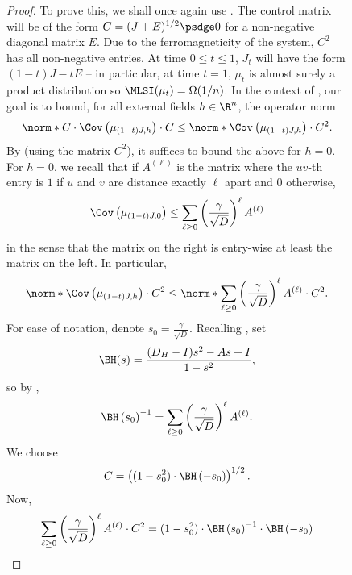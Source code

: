 \documentclass[11pt,letterpaper]{article}
\begin{document}
\begin{figure}
\begin{proof}
        To prove this, we shall once again use . The control matrix will be of the form $C = (J+E)^{1/2} \psdge 0$ for a non-negative diagonal matrix $E$. Due to the ferromagneticity of the system, $C^2$ has all non-negative entries. At time $0 \le t \le 1$, $J_t$ will have the form $(1-t) J - tE$ -- in particular, at time $t=1$, $\mu_t$ is almost surely a product distribution so $\MLSI(\mu_t) = \Omega(1/n)$. In the context of , our goal is to bound, for all external fields $h \in \R^n$, the operator norm
        \begin{equation}
            \label{eq:bethe-hessian-coincidence-1}
            \norm*{C \cdot \Cov\left( \mu_{(1-t)J,h} \right) \cdot C} \le \norm*{\Cov\left( \mu_{(1-t)J,h} \right) \cdot C^2 }.
        \end{equation}
        By  (using the matrix $C^2$), it suffices to bound the above for $h = 0$. For $h = 0$, we recall that if $A^{(\ell)}$ is the matrix where the $uv$-th entry is $1$ if $u$ and $v$ are distance exactly $\ell$ apart and $0$ otherwise,
        \[ \Cov\left( \mu_{(1-t)J,0} \right) \le \sum_{\ell \ge 0} \left( \frac{\gamma}{\sqrt{D}} \right)^{\ell} A^{(\ell)} \]
        in the sense that the matrix on the right is entry-wise at least the matrix on the left.
        In particular,
        \begin{equation}
            \label{eq:bethe-hessian-coincidence-2}
            \norm*{\Cov\left( \mu_{(1-t)J,h} \right) \cdot C^2 } \le \norm*{ \sum_{\ell \ge 0} \left( \frac{\gamma}{\sqrt{D}} \right)^{\ell} A^{(\ell)} \cdot C^2 }.
        \end{equation}
        For ease of notation, denote $s_0 = \frac{\gamma}{\sqrt{D}}$. Recalling , set
        \[ \BH(s) = \frac{(D_H - I) s^2 - As + I}{1-s^2}, \]
        so by ,
        \[ \BH\left( s_0 \right)^{-1} = \sum_{\ell \ge 0} \left( \frac{\gamma}{\sqrt{D}} \right)^\ell A^{(\ell)}. \]
        We choose
        \begin{align}
            \label{eq:control-matrix-tree-mlsi}
            C = \left((1-s_0^2) \cdot \BH\left( - s_0 \right)\right)^{1/2} .
        \end{align}
        Now,
        \begin{align*}
            \sum_{\ell \ge 0} \left( \frac{\gamma}{\sqrt{D}} \right)^{\ell} A^{(\ell)} \cdot C^2 &= (1-s_0^2) \cdot \BH\left( s_0 \right)^{-1} \cdot \BH\left( -s_0 \right) \\

\end{align*}
\end{proof}
\end{figure}
\end{document}
